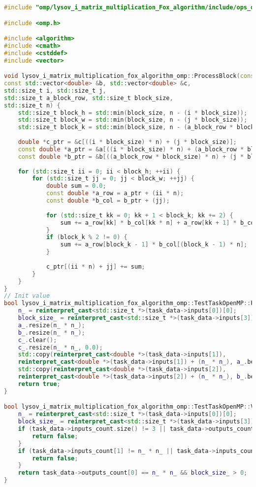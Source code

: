 \documentclass[12pt,a4paper]{extarticle}
\begin{document}
\begin{lstlisting}[language=C++]
#include "omp/lysov_i_matrix_multiplication_Fox_algorithm/include/ops_omp.hpp"

#include <omp.h>

#include <algorithm>
#include <cmath>
#include <cstddef>
#include <vector>

void lysov_i_matrix_multiplication_fox_algorithm_omp::ProcessBlock(const std::vector<double> &a,
const std::vector<double> &b, std::vector<double> &c,
std::size_t i, std::size_t j,
std::size_t a_block_row, std::size_t block_size,
std::size_t n) {
	std::size_t block_h = std::min(block_size, n - (i * block_size));
	std::size_t block_w = std::min(block_size, n - (j * block_size));
	std::size_t block_k = std::min(block_size, n - (a_block_row * block_size));
	
	double *c_ptr = &c[((i * block_size) * n) + (j * block_size)];
	const double *a_ptr = &a[((i * block_size) * n) + (a_block_row * block_size)];
	const double *b_ptr = &b[((a_block_row * block_size) * n) + (j * block_size)];
	
	for (std::size_t ii = 0; ii < block_h; ++ii) {
		for (std::size_t jj = 0; jj < block_w; ++jj) {
			double sum = 0.0;
			const double *a_row = a_ptr + (ii * n);
			const double *b_col = b_ptr + (jj);
			
			for (std::size_t kk = 0; kk + 1 < block_k; kk += 2) {
				sum += a_row[kk] * b_col[kk * n] + a_row[kk + 1] * b_col[(kk + 1) * n];
			}
			if (block_k % 2 != 0) {
				sum += a_row[block_k - 1] * b_col[(block_k - 1) * n];
			}
			
			c_ptr[(ii * n) + jj] += sum;
		}
	}
}
// Init value
bool lysov_i_matrix_multiplication_fox_algorithm_omp::TestTaskOpenMP::PreProcessingImpl() {
	n_ = reinterpret_cast<std::size_t *>(task_data->inputs[0])[0];
	block_size_ = reinterpret_cast<std::size_t *>(task_data->inputs[3])[0];
	a_.resize(n_ * n_);
	b_.resize(n_ * n_);
	c_.clear();
	c_.resize(n_ * n_, 0.0);
	std::copy(reinterpret_cast<double *>(task_data->inputs[1]),
	reinterpret_cast<double *>(task_data->inputs[1]) + (n_ * n_), a_.begin());
	std::copy(reinterpret_cast<double *>(task_data->inputs[2]),
	reinterpret_cast<double *>(task_data->inputs[2]) + (n_ * n_), b_.begin());
	return true;
}

bool lysov_i_matrix_multiplication_fox_algorithm_omp::TestTaskOpenMP::ValidationImpl() {
	n_ = reinterpret_cast<std::size_t *>(task_data->inputs[0])[0];
	block_size_ = reinterpret_cast<std::size_t *>(task_data->inputs[3])[0];
	if (task_data->inputs_count.size() != 3 || task_data->outputs_count.size() != 1) {
		return false;
	}
	if (task_data->inputs_count[1] != n_ * n_ || task_data->inputs_count[0] != n_ * n_) {
		return false;
	}
	return task_data->outputs_count[0] == n_ * n_ && block_size_ > 0;
}


\end{lstlisting}
\end{document}
